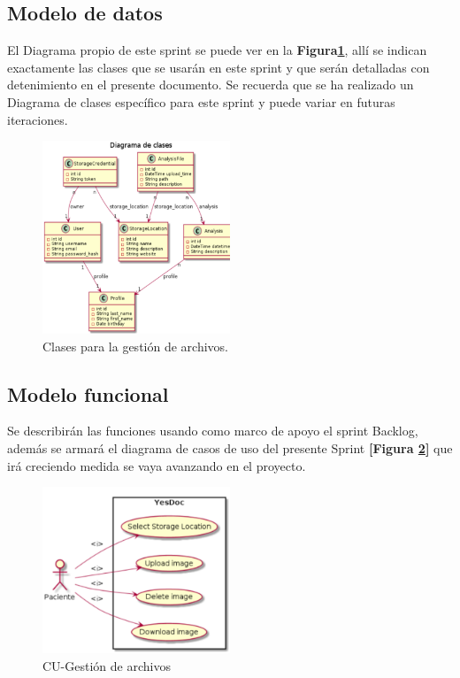 \documentclass[a4paper,12pt]{article}
\begin{document}
\subsection{Modelo de datos}
El Diagrama propio de este sprint se puede ver en la \textbf{Figura\ref{6-clases_file_upload}}, allí se indican exactamente las clases que se usarán en este sprint y que serán detalladas con detenimiento en el presente documento. Se recuerda que se ha realizado un Diagrama de clases específico para este sprint y puede variar en futuras iteraciones.
    \begin{figure}[h]
        \centering
        \includegraphics[width=0.5\textwidth]{img/dc_file_upload}
        \caption{Clases para la gestión de archivos.}
		\label{6-clases_file_upload}
    \end{figure}

\subsection{Modelo funcional} %
Se describirán las funciones usando como marco de apoyo el sprint Backlog, además se armará el diagrama de casos de uso del presente Sprint \textbf{[Figura \ref{6-cu_file_upload}]} que irá creciendo  medida se vaya avanzando en el proyecto.

    \begin{figure}[h]
        \centering
        \includegraphics[width=0.5\textwidth]{img/cu_file_upload}
        \caption{CU-Gestión de archivos}
		\label{6-cu_file_upload}
    \end{figure}
\end{document}
